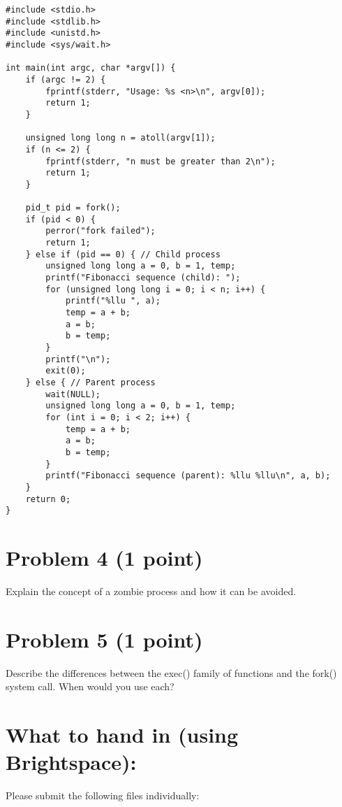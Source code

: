\documentclass{article}
\begin{document}
\lstset{language=C, basicstyle=\ttfamily\footnotesize}
\begin{lstlisting}
#include <stdio.h>
#include <stdlib.h>
#include <unistd.h>
#include <sys/wait.h>

int main(int argc, char *argv[]) {
    if (argc != 2) {
        fprintf(stderr, "Usage: %s <n>\n", argv[0]);
        return 1;
    }

    unsigned long long n = atoll(argv[1]);
    if (n <= 2) {
        fprintf(stderr, "n must be greater than 2\n");
        return 1;
    }

    pid_t pid = fork();
    if (pid < 0) {
        perror("fork failed");
        return 1;
    } else if (pid == 0) { // Child process
        unsigned long long a = 0, b = 1, temp;
        printf("Fibonacci sequence (child): ");
        for (unsigned long long i = 0; i < n; i++) {
            printf("%llu ", a);
            temp = a + b;
            a = b;
            b = temp;
        }
        printf("\n");
        exit(0);
    } else { // Parent process
        wait(NULL);
        unsigned long long a = 0, b = 1, temp;
        for (int i = 0; i < 2; i++) {
            temp = a + b;
            a = b;
            b = temp;
        }
        printf("Fibonacci sequence (parent): %llu %llu\n", a, b);
    }
    return 0;
}
\end{lstlisting}


\section*{Problem 4 (1 point)}

Explain the concept of a zombie process and how it can be avoided.


\section*{Problem 5 (1 point)}

Describe the differences between the exec() family of functions and the fork() system call.  When would you use each?

\section*{What to hand in (using Brightspace):}

Please submit the following files individually:
\end{document}
